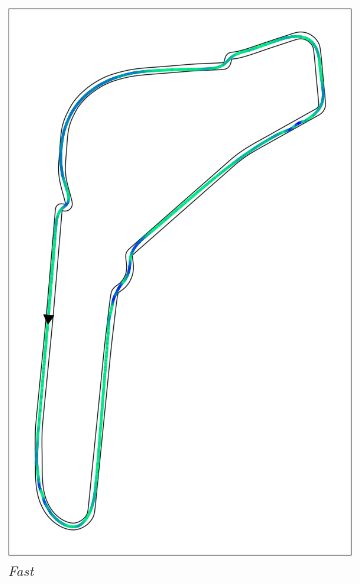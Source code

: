 \begin{figure}[H]
\begin{subfigure}[b]{0.3\textwidth}
        \includegraphics[width=\textwidth]{images/monza_mpc_fast_crosstrack.png}
        \caption{\textit{Fast}}
        \label{fig:tracking_fast_monza}
    \end{subfigure}
    \hfill
    \begin{subfigure}[b]{0.369\textwidth}
        \centering

\end{subfigure}
\end{figure}
